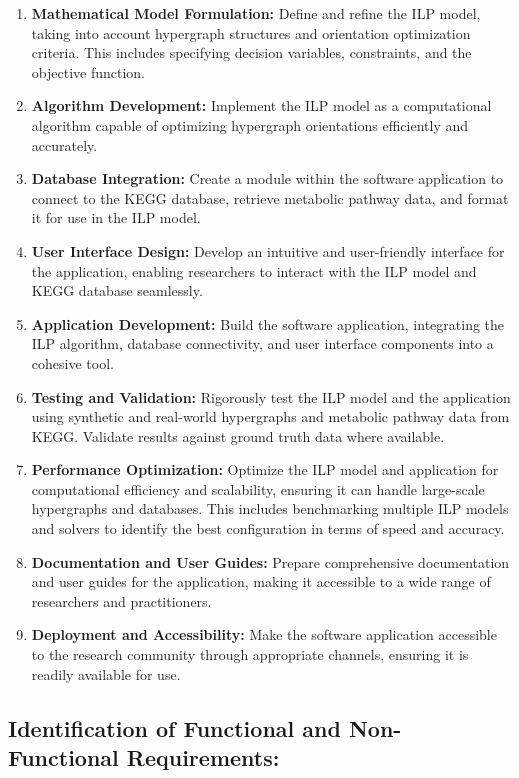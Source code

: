 \begin{enumerate}
    \item \textbf{Mathematical Model Formulation:} Define and refine the ILP model, taking into account hypergraph structures and orientation optimization criteria. This includes specifying decision variables, constraints, and the objective function.
    \item \textbf{Algorithm Development:} Implement the ILP model as a computational algorithm capable of optimizing hypergraph orientations efficiently and accurately.
    \item \textbf{Database Integration:} Create a module within the software application to connect to the KEGG database, retrieve metabolic pathway data, and format it for use in the ILP model.
    \item \textbf{User Interface Design:} Develop an intuitive and user-friendly interface for the application, enabling researchers to interact with the ILP model and KEGG database seamlessly.
    \item \textbf{Application Development:} Build the software application, integrating the ILP algorithm, database connectivity, and user interface components into a cohesive tool.
    \item \textbf{Testing and Validation:} Rigorously test the ILP model and the application using synthetic and real-world hypergraphs and metabolic pathway data from KEGG. Validate results against ground truth data where available.
    \item \textbf{Performance Optimization:} Optimize the ILP model and application for computational efficiency and scalability, ensuring it can handle large-scale hypergraphs and databases. This includes benchmarking multiple ILP models and solvers to identify the best configuration in terms of speed and accuracy.
    \item \textbf{Documentation and User Guides:} Prepare comprehensive documentation and user guides for the application, making it accessible to a wide range of researchers and practitioners.
    \item \textbf{Deployment and Accessibility:} Make the software application accessible to the research community through appropriate channels, ensuring it is readily available for use.
\end{enumerate}

\subsection{Identification of Functional and Non-Functional Requirements:}

